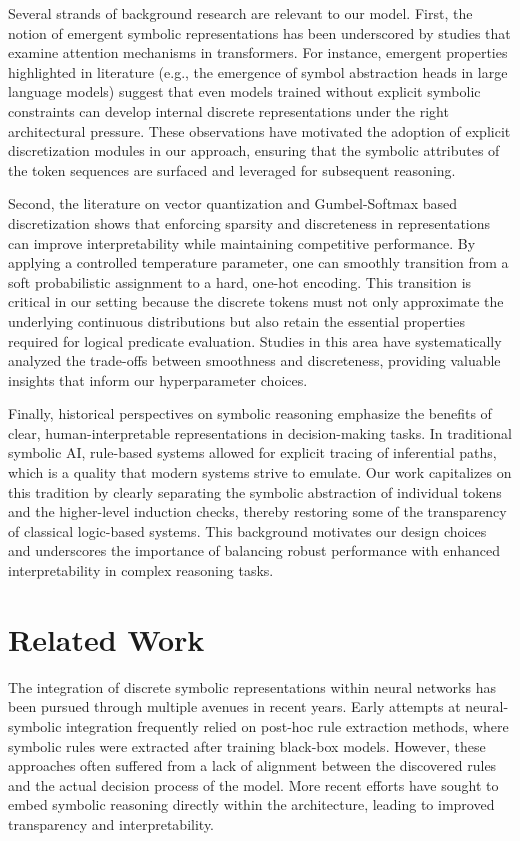 \documentclass[11pt]{article}
\begin{document}
Several strands of background research are relevant to our model. First, the notion of emergent symbolic representations has been underscored by studies that examine attention mechanisms in transformers. For instance, emergent properties highlighted in literature (e.g., the emergence of symbol abstraction heads in large language models) suggest that even models trained without explicit symbolic constraints can develop internal discrete representations under the right architectural pressure. These observations have motivated the adoption of explicit discretization modules in our approach, ensuring that the symbolic attributes of the token sequences are surfaced and leveraged for subsequent reasoning. 

Second, the literature on vector quantization and Gumbel-Softmax based discretization shows that enforcing sparsity and discreteness in representations can improve interpretability while maintaining competitive performance. By applying a controlled temperature parameter, one can smoothly transition from a soft probabilistic assignment to a hard, one-hot encoding. This transition is critical in our setting because the discrete tokens must not only approximate the underlying continuous distributions but also retain the essential properties required for logical predicate evaluation. Studies in this area have systematically analyzed the trade-offs between smoothness and discreteness, providing valuable insights that inform our hyperparameter choices.

Finally, historical perspectives on symbolic reasoning emphasize the benefits of clear, human-interpretable representations in decision-making tasks. In traditional symbolic AI, rule-based systems allowed for explicit tracing of inferential paths, which is a quality that modern systems strive to emulate. Our work capitalizes on this tradition by clearly separating the symbolic abstraction of individual tokens and the higher-level induction checks, thereby restoring some of the transparency of classical logic-based systems. This background motivates our design choices and underscores the importance of balancing robust performance with enhanced interpretability in complex reasoning tasks.

\section{Related Work}
The integration of discrete symbolic representations within neural networks has been pursued through multiple avenues in recent years. Early attempts at neural-symbolic integration frequently relied on post-hoc rule extraction methods, where symbolic rules were extracted after training black-box models. However, these approaches often suffered from a lack of alignment between the discovered rules and the actual decision process of the model. More recent efforts have sought to embed symbolic reasoning directly within the architecture, leading to improved transparency and interpretability.
\end{document}
